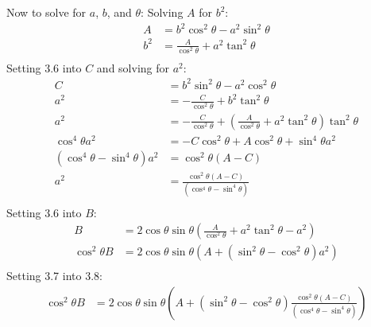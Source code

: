 Now to solve for $a$, $b$, and $\theta$:
Solving $A$ for $b^2$:
\begin{equation}
	\begin{split}
		A &= b^2 \cos^2\theta - a^2 \sin^2\theta \\
		b^2 &= \frac{A}{\cos^2\theta} + a^2\tan^2\theta \\
	\end{split}
\end{equation}
Setting 3.6 into $C$ and solving for $a^2$:
\begin{equation}
	\begin{split}
		C &= b^2 \sin^2\theta - a^2 \cos^2\theta \\
		a^2 &= -\frac{C}{\cos^2\theta} + b^2\tan^2\theta \\
		a^2 &= -\frac{C}{\cos^2\theta} + \left(\frac{A}{\cos^2\theta} + a^2\tan^2\theta\right)\tan^2\theta \\
		\cos^4\theta a^2 &= -C\cos^2\theta + A\cos^2\theta + \sin^4\theta a^2 \\
		(\cos^4\theta - \sin^4\theta) a^2  &= \cos^2\theta(A-C) \\
		a^2  &= \frac{\cos^2\theta(A-C)}{(\cos^4\theta - \sin^4\theta)} \\
	\end{split}
\end{equation}
Setting 3.6 into $B$:
\begin{equation}
	\begin{split}
		B &= 2 \cos\theta\sin\theta(\frac{A}{\cos^2\theta} + a^2\tan^2\theta - a^2) \\
		\cos^2\theta B &= 2 \cos\theta\sin\theta(A + (\sin^2\theta - \cos^2\theta) a^2) \\
	\end{split}
\end{equation}
Setting 3.7 into 3.8:
\begin{equation}
	\begin{split}
		\cos^2\theta B &= 2 \cos\theta\sin\theta(A + (\sin^2\theta - \cos^2\theta) \frac{\cos^2\theta(A-C)}{(\cos^4\theta - \sin^4\theta)}) \\
	\end{split}
\end{equation}

